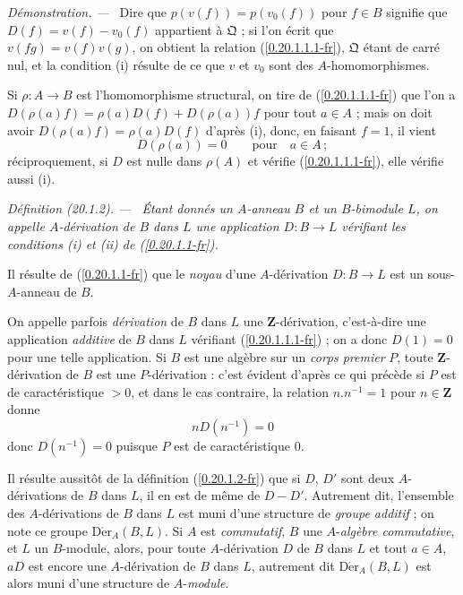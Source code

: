 \documentclass[10pt,oneside]{book}
\makeatletter
\newcommand{\sref}[1]{(\ref{#1})}
\newcommand{\setmanualcurrentlabel}[1]{\def\@currentlabel{#1}}
\newenvironment{definition}[1][]{%
  \setmanualcurrentlabel{#1}\par\medskip\noindent\itshape Définition (#1). ---\ }{\par}
\newenvironment{proof}{%
  \par\medskip\noindent\textit{Démonstration. ---\ }}{\par}
\makeatother
\begin{document}
\begin{proof}
Dire que $p(v(f))=p(v_0(f))$ pour $f\in B$ signifie que
$D(f)=v(f)-v_0(f)$ appartient à $\mathfrak{Q}$ ; si l'on écrit que
$v(fg)=v(f)v(g)$, on obtient la relation \sref{0.20.1.1.1-fr},
$\mathfrak{Q}$ étant de carré nul, et la condition (i) résulte de ce que $v$
et $v_0$ sont des $A$-homomorphismes.

Si $\rho:A\to B$ est l'homomorphisme structural, on tire de
\sref{0.20.1.1.1-fr} que l'on a
$D(\rho(a)f)=\rho(a)D(f)+D(\rho(a))f$ pour tout $a\in A$ ; mais on doit
avoir $D(\rho(a)f)=\rho(a)D(f)$ d'après (i), donc, en faisant $f=1$, il
vient
\[
  D(\rho(a))=0 \qquad\text{pour}\quad a\in A\,;
\]
réciproquement, si $D$ est nulle dans $\rho(A)$ et vérifie
\sref{0.20.1.1.1-fr}, elle vérifie aussi (i).
\end{proof}

\begin{definition}[20.1.2]
\label{0.20.1.2-fr}
Étant donnés un $A$-anneau $B$ et un $B$-bimodule $L$, on appelle
\emph{$A$-dérivation de $B$ dans $L$} une application $D:B\to L$ vérifiant
les conditions (i) et (ii) de \sref{0.20.1.1-fr}.
\end{definition}

Il résulte de \sref{0.20.1.1-fr} que le \emph{noyau} d'une $A$-dérivation
$D:B\to L$ est un sous-$A$-anneau de $B$.

On appelle parfois \emph{dérivation} de $B$ dans $L$ une
$\mathbf{Z}$-dérivation, c'est-à-dire une application \emph{additive} de $B$
dans $L$ vérifiant \sref{0.20.1.1.1-fr} ; on a donc $D(1)=0$ pour une telle
application. Si $B$ est une algèbre sur un \emph{corps premier} $P$, toute
$\mathbf{Z}$-dérivation de $B$ est une $P$-dérivation : c'est évident d'après
ce qui précède si $P$ est de caractéristique $>0$, et dans le cas contraire,
la relation $n.n^{-1}=1$ pour $n\in\mathbf{Z}$ donne
\[
  nD(n^{-1})=0
\]
donc $D(n^{-1})=0$ puisque $P$ est de caractéristique $0$.

Il résulte aussitôt de la définition \sref{0.20.1.2-fr} que si $D$, $D'$ sont
deux $A$-dérivations de $B$ dans $L$, il en est de même de $D-D'$. Autrement
dit, l'ensemble des $A$-dérivations de $B$ dans $L$ est muni d'une structure
de \emph{groupe additif} ; on note ce groupe
$\operatorname{D\acute{e}r}_A(B,L)$. Si $A$ est \emph{commutatif}, $B$ une
$A$-\emph{algèbre commutative}, et $L$ un $B$-module, alors, pour toute
$A$-dérivation $D$ de $B$ dans $L$ et tout $a\in A$, $aD$ est encore une
$A$-dérivation de $B$ dans $L$, autrement dit $\operatorname{D\acute{e}r}_A(B,L)$
est alors muni d'une structure de $A$-\emph{module}.
\end{document}
